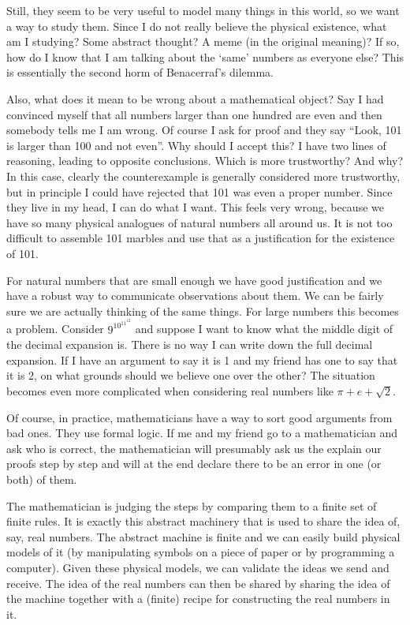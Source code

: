 \documentclass{report}
\begin{document}
Still, they seem to be very useful to model many things in this world, so we want a way to study them. Since I do not really believe the physical existence, what am I studying? Some abstract thought? A meme (in the original meaning)? If so, how do I know that I am talking about the `same' numbers as everyone else? This is essentially the second horm of Benacerraf's dilemma.

Also, what does it mean to be wrong about a mathematical object? Say I had convinced myself that all numbers larger than one hundred are even and then somebody tells me I am wrong. Of course I ask for proof and they say ``Look, 101 is larger than 100 and not even''. Why should I accept this? I have two lines of reasoning, leading to opposite conclusions. Which is more trustworthy? And why?
In this case, clearly the counterexample is generally considered more trustworthy, but in principle I could have rejected that 101 was even a proper number. Since they live in my head, I can do what I want. This feels very wrong, because we have so many physical analogues of natural numbers all around us. It is not too difficult to assemble 101 marbles and use that as a justification for the existence of 101.

For natural numbers that are small enough we have good justification and we have a robust way to communicate observations about them. We can be fairly sure we are actually thinking of the same things. For large numbers this becomes a problem. Consider $9^{10^{11^{12}}}$ and suppose I want to know what the middle digit of the decimal expansion is. There is no way I can write down the full decimal expansion. If I have an argument to say it is 1 and my friend has one to say that it is 2, on what grounds should we believe one over the other? The situation becomes even more complicated when considering real numbers like $\pi+e+\sqrt{2}$.

Of course, in practice, mathematicians have a way to sort good arguments from bad ones. They use formal logic. If me and my friend go to a mathematician and ask who is correct, the mathematician will presumably ask us the explain our proofs step by step and will at the end declare there to be an error in one (or both) of them.

The mathematician is judging the steps by comparing them to a finite set of finite rules. It is exactly this abstract machinery that is used to share the idea of, say, real numbers. The abstract machine is finite and we can easily build physical models of it (by manipulating symbols on a piece of paper or by programming a computer). Given these physical models, we can validate the ideas we send and receive. The idea of the real numbers can then be shared by sharing the idea of the machine together with a (finite) recipe for constructing the real numbers in it.
\end{document}
